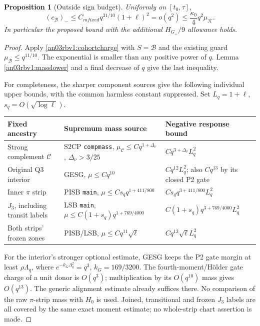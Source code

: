 \documentclass[11pt]{article}
\numberwithin{equation}{section}
\newtheorem{proposition}[theorem]{Proposition}
\theoremstyle{remark}\newtheorem{remark}[theorem]{Remark}
\newcommand{\KK}{\mathcal K}
\newcommand{\BB}{\mathcal B}
\newcommand{\Gp}{G_+}
\begin{document}
\begin{proposition}[Outside sign budget]
\label{an03rbv1:outside}
Uniformly on $[t_0,\tau]$,
\begin{equation}
 (c_{\BB})_-\le C_{
m fixed}q^{31/10}(1+\ell)^2=o(q^2)
       \le\frac{\kappa_0}{4}q^2\mu_{\KK}.
 \label{an03rbv1:outsidebudget}
\end{equation}
In particular the proposed bound with the additional
$H_{\Gp}/9$ allowance holds.
\end{proposition}
\begin{proof}
Apply \eqref{an03rbv1:cohortcharge} with $S=\BB$ and the existing
guard $\mu_{\BB}\le q^{11/10}$. The exponential is smaller than
any positive power of $q$. Lemma \ref{an03rbv1:masslower} and
a final decrease of $q$ give the last inequality.

For completeness, the sharper component sources give the following
individual upper bounds, with the common harmless constant suppressed.
Set $L_q=1+\ell$, $s_q=O(\sqrt{\log\ell})$.
\begin{center}
\begin{tabular}{p{}p{}p{}}
\toprule
Fixed ancestry & Supremum mass source & Negative response bound\\
\midrule
Strong complement $\mathcal C$ & S2CP \texttt{compmass},
$\mu_{\mathcal C}\le Cq^{1+\Delta_\nu}$,
$\Delta_\nu>3/25$ & $Cq^{3+\Delta_\nu}L_q^2$\\[3pt]
Original Q3 interior & GESG, $\mu\le Cq^{10}$ &
$Cq^{12}L_q^2$; also $Cq^{13}$ by its closed P2 gate\\[3pt]
Inner $\pi$ strip & PISB \texttt{main},
$\mu\le Cs_qq^{1+411/800}$ &
$Cs_qq^{3+411/800}L_q^2$\\[3pt]
$J_3$, including transit labels & LSB \texttt{main},
$\mu\le C(1+s_q)q^{1+769/4000}$ &
$C(1+s_q)q^{3+769/4000}L_q^2$\\[3pt]
Both strips' frozen zones & PISB/LSB,
$\mu\le Cq^{11}\sqrt\ell$ & $Cq^{13}\sqrt\ell L_q^2$\\
\bottomrule
\end{tabular}
\end{center}
For the interior's stronger optional estimate, GESG keeps the P2
gate margin at least $\rho\Lambda_q$, where
$e^{-k_G\Lambda_q^2}=q^3$, $k_G=169/3200$.
The fourth-moment/H\"older gate charge of a unit donor is $O(q^3)$;
multiplication by its $O(q^{10})$ mass gives $O(q^{13})$.
The generic alignment estimate already suffices there.
No comparison of the raw $\pi$-strip mass with $H_0$ is used.
Joined, transitional and frozen $J_3$ labels are all covered by
the same exact moment estimate; no whole-strip chart assertion is made.
\end{proof}
\end{document}
